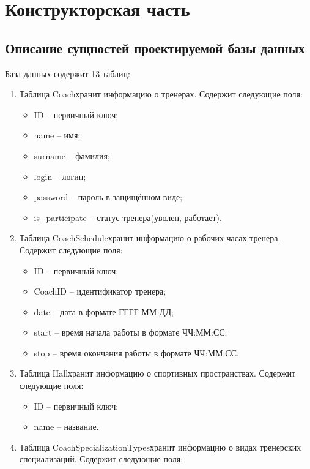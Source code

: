 \chapter{Конструкторская часть}

\section{Описание сущностей проектируемой базы данных}

База данных содержит 13 таблиц:

\begin{enumerate}
	\item Таблица \guillemotleft Coach\guillemotright хранит информацию о тренерах. Содержит следующие поля:
	\begin{itemize}[label=—]
		\item ID -- первичный ключ;
		\item name -- имя;
		\item surname -- фамилия;
		\item login -- логин;
		\item password -- пароль в защищённом виде;
		\item is\_participate -- статус тренера(уволен, работает).
	\end{itemize}
	\item Таблица \guillemotleft CoachSchedule\guillemetright хранит информацию о рабочих часах тренера. Содержит следующие поля:
	\begin{itemize}[label=—]
		\item ID -- первичный ключ;
		\item CoachID -- идентификатор тренера;
		\item date -- дата в формате ГГГГ-ММ-ДД;
		\item start -- время начала работы в формате ЧЧ:ММ:СС;
		\item stop -- время окончания работы в формате ЧЧ:ММ:СС.
	\end{itemize}
	\item Таблица \guillemotleft Hall\guillemetright хранит информацию о спортивных пространствах. Содержит следующие поля:
	\begin{itemize}[label=—]
		\item ID -- первичный ключ;
		\item name -- название.
	\end{itemize}
	\item Таблица \guillemotleft CoachSpecializationTypes\guillemetright хранит информацию о видах тренерских специализаций. Содержит следующие поля:

\end{enumerate}
